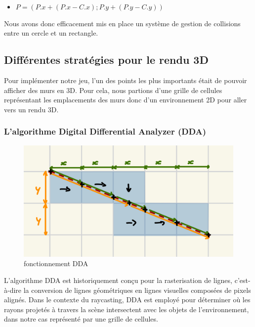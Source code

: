 \documentclass[11pt]{article}
\begin{document}
\begin{itemize}
	\item[] $P = (P.x + (P.x - C.x) ; P.y + (P.y - C.y))$
\end{itemize}

Nous avons donc efficacement mis en place un système de gestion de 
collisions entre un cercle et un rectangle.

\subsection{Différentes stratégies pour le rendu 3D}
Pour implémenter notre jeu, l'un des points les plus importants était de pouvoir afficher des murs en 3D. Pour cela, nous partions d'une grille de cellules 
représentant les emplacements des murs donc d'un environnement 2D pour aller vers un rendu 3D.

\subsubsection{L'algorithme Digital Differential Analyzer (DDA)}

\begin{figure}
	\begin{minipage}{\textwidth}
		\center\includegraphics[width=0.8\linewidth]{image/dda1.jpeg}
		\hspace*{-0.5cm}
		\caption{fonctionnement DDA}
		\label{fig:dda1}
	\end{minipage}
\end{figure}

L'algorithme DDA est historiquement conçu pour la rasterisation de lignes, c'est-à-dire la conversion de lignes géométriques en lignes visuelles composées de pixels 
alignés. Dans le contexte du raycasting, DDA est employé pour déterminer où les rayons projetés à travers la scène intersectent avec les objets de l'environnement, 
dans notre cas représenté par une grille de cellules.
\end{document}

